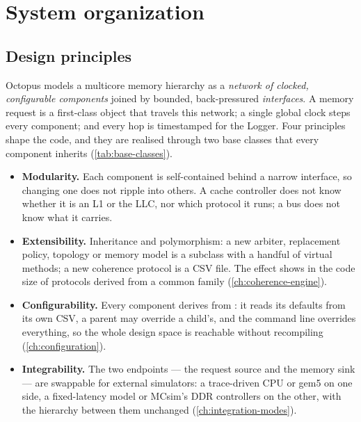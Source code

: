 \chapter{System organization}\label{ch:system-organization}


\section{Design principles}

Octopus models a multicore memory hierarchy as a \emph{network of clocked, configurable
components} joined by bounded, back-pressured \emph{interfaces}. A memory request is a
first-class  object that travels this network; a single global clock steps every
component; and every hop is timestamped for the Logger. Four principles shape the code, and
they are realised through two base classes that every component inherits
(\cref{tab:base-classes}).

\begin{itemize}
\item \textbf{Modularity.} Each component is self-contained behind a narrow interface, so
  changing one does not ripple into others. A cache controller does not know whether it is an
  L1 or the LLC, nor which protocol it runs; a bus does not know what it carries.
\item \textbf{Extensibility.} Inheritance and polymorphism: a new arbiter, replacement policy,
  topology or memory model is a subclass with a handful of virtual methods; a new coherence
  protocol is a CSV file. The effect shows in the code size of protocols derived from a common
  family (\cref{ch:coherence-engine}).
\item \textbf{Configurability.} Every component derives from : it reads its
  defaults from its own CSV, a parent may override a child's, and the command line overrides
  everything, so the whole design space is reachable without recompiling
  (\cref{ch:configuration}).
\item \textbf{Integrability.} The two endpoints --- the request source and the memory sink ---
  are swappable for external simulators: a trace-driven CPU or gem5 on one side, a fixed-latency
  model or MCsim's DDR controllers on the other, with the hierarchy between them unchanged
  (\cref{ch:integration-modes}).
\end{itemize}

